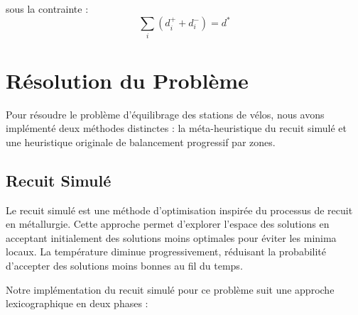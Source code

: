 \documentclass{article}
\begin{document}
sous la contrainte :
\[
\sum_i (d_i^+ + d_i^-) = d^*
\]

\section{Résolution du Problème}

Pour résoudre le problème d'équilibrage des stations de vélos, nous avons implémenté deux méthodes distinctes : la méta-heuristique du recuit simulé et une heuristique originale de balancement progressif par zones.

\subsection{Recuit Simulé}

Le recuit simulé est une méthode d'optimisation inspirée du processus de recuit en métallurgie. Cette approche permet d'explorer l'espace des solutions en acceptant initialement des solutions moins optimales pour éviter les minima locaux. La température diminue progressivement, réduisant la probabilité d'accepter des solutions moins bonnes au fil du temps.

Notre implémentation du recuit simulé pour ce problème suit une approche lexicographique en deux phases :
\end{document}
